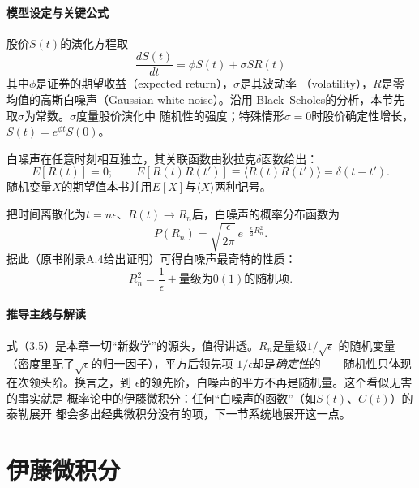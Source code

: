 \paragraph{模型设定与关键公式}
股价$S(t)$的演化方程取
\begin{equation*}
\frac{dS(t)}{dt}=\phi S(t)+\sigma S R(t)
\tag{3.2}
\end{equation*}
其中$\phi$是证券的期望收益（expected return），$\sigma$是其波动率
（volatility），$R$是零均值的高斯白噪声（Gaussian white noise）。沿用
Black--Scholes的分析，本节先取$\sigma$为常数。$\sigma$度量股价演化中
随机性的强度；特殊情形$\sigma=0$时股价确定性增长，$S(t)=e^{\phi t}S(0)$。

白噪声在任意时刻相互独立，其关联函数由狄拉克$\delta$函数给出：
\begin{equation*}
E[R(t)]=0;\qquad E[R(t)R(t')]\equiv\langle R(t)R(t')\rangle=\delta(t-t').
\tag{3.3}
\end{equation*}
随机变量$X$的期望值本书并用$E[X]$与$\langle X\rangle$两种记号。

把时间离散化为$t=n\epsilon$、$R(t)\to R_n$后，白噪声的概率分布函数为
\begin{equation*}
P(R_n)=\sqrt{\frac{\epsilon}{2\pi}}\,e^{-\frac{\epsilon}{2}R_n^{2}}.
\tag{3.4}
\end{equation*}
据此（原书附录A.4给出证明）可得白噪声最奇特的性质：
\begin{equation*}
R_n^{2}=\frac{1}{\epsilon}+\text{量级为}0(1)\text{的随机项}.
\tag{3.5}
\end{equation*}

\paragraph{推导主线与解读}
式（3.5）是本章一切“新数学”的源头，值得讲透。$R_n$是量级$1/\sqrt{\epsilon}$
的随机变量（密度里配了$\sqrt{\epsilon}$的归一因子），平方后领先项
$1/\epsilon$却是\emph{确定性}的——随机性只体现在次领头阶。换言之，到
$\epsilon$的领先阶，白噪声的平方不再是随机量。这个看似无害的事实就是
概率论中的伊藤微积分：任何“白噪声的函数”（如$S(t)$、$C(t)$）的泰勒展开
都会多出经典微积分没有的项，下一节系统地展开这一点。

\section{伊藤微积分}

